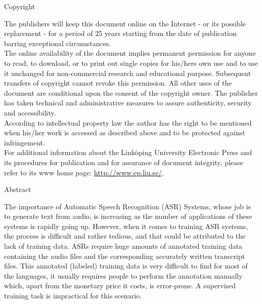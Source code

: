 \documentclass[
  a4paper,
]{article}
\begin{document}
\bigskip

\begin{center}

\large{Copyright}

\end{center}
\bigskip

The publishers will keep this document online on the Internet - or its
possible replacement - for a period of 25 years starting from the date
of publication barring exceptional circumstances.\\
The online availability of the document implies permanent permission for
anyone to read, to download, or to print out single copies for his/hers
own use and to use it unchanged for non-commercial research and
educational purpose. Subsequent transfers of copyright cannot revoke
this permission. All other uses of the document are conditional upon the
consent of the copyright owner. The publisher has taken technical and
administrative measures to assure authenticity, security and
accessibility.\\
According to intellectual property law the author has the right to be
mentioned when his/her work is accessed as described above and to be
protected against infringement.\\
For additional information about the Linköping University Electronic
Press and its procedures for publication and for assurance of document
integrity, please refer to its www home page:
\url{http://www.ep.liu.se/}.

\newpage

\begin{center}

\large{Abstract}

\end{center}

\bigskip


The importance of Automatic Speech Recognition (ASR) Systems, whose job
is to generate text from audio, is increasing as the number of
applications of these systems is rapidly going up. However, when it
comes to training ASR systems, the process is difficult and rather
tedious, and that could be attributed to the lack of training data. ASRs
require huge amounts of annotated training data containing the audio
files and the corresponding accurately written transcript files. This
annotated (labeled) training data is very difficult to find for most of
the languages, it usually requires people to perform the annotation
manually which, apart from the monetary price it costs, is error-prone.
A supervised training task is impractical for this scenario.
\end{document}

